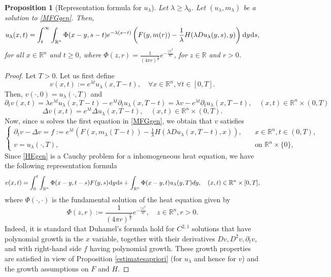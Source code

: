 \documentclass{amsart}
\newtheorem{prop}[thm]{Proposition}
\theoremstyle{remark}
\theoremstyle{definition}
\theoremstyle{Claim}
\newcommand{\dd}{\hspace{0.7pt}{\rm d}}
\theoremstyle{plain}
\begin{document}
\begin{prop}[Representation formula for $u_\lambda$]
		Let $\lambda\geq \lambda_0$. Let $(u_\lambda,m_\lambda)$ be a solution to \eqref{MFGgen}. Then, 
		\begin{equation}\label{urepformulagen}
		{u_\lambda(x,t)}=\int_{t}^{\infty}\int_{\mathbb{R}^n} \Phi(x-y,s-t) e^{-\lambda (s-t)}\left(F(y,m(r))-\frac{1}{\lambda}H(\lambda Du_\lambda(y,s),y)\right)\dd y \dd s,
		\end{equation}
		for all $x\in \mathbb{R}^n$ and $t\geq 0$, where $\Phi(z,r)=\frac{1}{(4\pi r)^{\frac{n}{2}}}e^{-\frac{\lvert z\rvert^2}{4r}}$, for $z\in \mathbb{R}$ and $r>0$.
	\end{prop}
	
	\begin{proof}
		Let $T>0$. Let us first define
		$$v(x,t):=e^{\lambda t}{u_{\lambda}}(x,T-t),\quad \forall x\in \mathbb{R}^n,\forall t\in [0,T].$$
		Then, $v(\cdot,0)=u_\lambda(\cdot,T)$ and 
		$$\partial_tv(x,t)=\lambda e^{\lambda t}u_\lambda(x,T-t)-e^{\lambda t}\partial_t u_\lambda(x,T-t)=\lambda v-e^{\lambda t}\partial_t u_\lambda(x,T-t),\quad (x,t)\in \mathbb{R}^n\times(0,T)$$
		$$\Delta v(x,t)=e^{\lambda t}\Delta u_\lambda(x,T-t),\quad (x,t)\in \mathbb{R}^n\times(0,T).$$
		Now, since $u$ solves the first equation in \eqref{MFGgen}, we obtain that $v$ satisfies 
		\begin{equation}\label{HEgen}
			\begin{cases}
				\partial_tv-\Delta v= f:= e^{\lambda t}\left(F(x,m_\lambda(T-t))-\frac{1}{\lambda}H(\lambda Du_\lambda(x,T-t),x)\right) ,\quad &x\in \mathbb{R}^n, t\in (0,T),\\
				v=u_\lambda(\cdot,T),\quad &\text{on }\mathbb{R}^n\times\{0\},
			\end{cases}
		\end{equation}
		Since \eqref{HEgen} is a Cauchy problem for a inhomogeneous heat equation, we have the following representation formula
		$$v(x,t)=\int_{0}^{t}\int_{\mathbb{R}^n}\Phi(x-y,t-s){F}(y,s)\dd y\dd s+\int_{\mathbb{R}^n}\Phi(x-y,t)u_\lambda(y,T)dy,\quad (x,t)\in \mathbb{R}^n\times [0,T],$$
		where $\Phi(\cdot,\cdot)$ is the fundamental solution of the heat equation given by
		$$\Phi(z,r):=\frac{1}{(4\pi r)^{\frac{n}{2}}}e^{-\frac{\lvert z\rvert^2}{4r}},\quad z\in \mathbb{R}^n,r>0.$$
		Indeed, it is standard that Duhamel's formula hold for $C^{2,1}$ solutions that have polynomial growth in the $x$ variable, together with their derivatives $Dv, D^2v, \partial_t v$, and with right-hand side $f$ having polynomial growth. These growth properties are satisfied in view of Proposition \ref{estimatesapriori} (for $u_\lambda$ and hence for $v$) and the growth assumptions on $F$ and $H$.
		

\end{proof}
\end{document}
